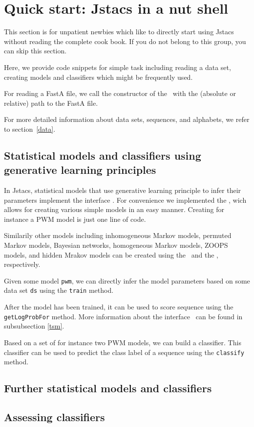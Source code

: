 \section{Quick start: Jstacs in a nut shell}

This section is for unpatient newbies which like to directly start using Jstacs without reading the complete cook book. If you do not belong to this group, you can skip this section.

Here, we provide code snippets for simple task including reading a data set, creating models and classifiers which might be frequently used.

For reading a FastA file, we call the constructor of the \DNADataSet~with the (absolute or relative) path to the FastA file.
\addtocounter{off}{224}
\addtocounter{off}{-224}
For more detailed information about data sets, sequences, and alphabets, we refer to section~\ref{data}.

\subsection{Statistical models and classifiers using generative learning principles}

In Jstacs, statistical models that use generative learning principle to infer their parameters implement the interface \TrainSM. For convenience we implemented the \TrainSMFactory, wich allows for creating various simple models in an easy manner. Creating for instance a PWM model is just one line of code.
\addtocounter{off}{397}
\addtocounter{off}{-397}

Similarily other models including inhomogeneous Markov models, permuted Markov models, Bayesian networks, homogeneous Markov models, ZOOPS models, and hidden Mrakov models can be created using the \TrainSMFactory~and the \HMMFactory, respectively.

Given some model \lstinline+pwm+, we can directly infer the model parameters based on some data set \lstinline+ds+ using the \lstinline+train+ method.
\addtocounter{off}{404}
\addtocounter{off}{-404}

After the model has been trained, it can be used to score sequence using the \lstinline+getLogProbFor+ method. More information about the interface \TrainSM~can be found in subsubsection \ref{tsm}.

Based on a set of \TrainSM for instance two PWM models, we can build a classifier.
\setcounter{off}{553}
\setcounter{off}{-553}
This classifier can be used to predict the class label of a sequence using the \lstinline+classify+ method.

\subsection{Further statistical models and classifiers}

\subsection{Assessing classifiers}